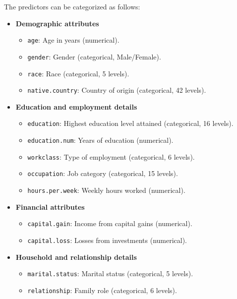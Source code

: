 \documentclass[
  11pt,
]{book}
\providecommand{\tightlist}{%
  \setlength{\itemsep}{0pt}\setlength{\parskip}{0pt}}
\theoremstyle{definition}
\theoremstyle{definition}
\theoremstyle{definition}
\theoremstyle{definition}
\theoremstyle{remark}
\begin{document}
The predictors can be categorized as follows:

\begin{itemize}
\tightlist
\item
  \textbf{Demographic attributes}

  \begin{itemize}
  \tightlist
  \item
    \texttt{age}: Age in years (numerical).\\
  \item
    \texttt{gender}: Gender (categorical, Male/Female).\\
  \item
    \texttt{race}: Race (categorical, 5 levels).\\
  \item
    \texttt{native.country}: Country of origin (categorical, 42 levels).
  \end{itemize}
\item
  \textbf{Education and employment details}

  \begin{itemize}
  \tightlist
  \item
    \texttt{education}: Highest education level attained (categorical, 16 levels).\\
  \item
    \texttt{education.num}: Years of education (numerical).\\
  \item
    \texttt{workclass}: Type of employment (categorical, 6 levels).\\
  \item
    \texttt{occupation}: Job category (categorical, 15 levels).\\
  \item
    \texttt{hours.per.week}: Weekly hours worked (numerical).
  \end{itemize}
\item
  \textbf{Financial attributes}

  \begin{itemize}
  \tightlist
  \item
    \texttt{capital.gain}: Income from capital gains (numerical).\\
  \item
    \texttt{capital.loss}: Losses from investments (numerical).
  \end{itemize}
\item
  \textbf{Household and relationship details}

  \begin{itemize}
  \tightlist
  \item
    \texttt{marital.status}: Marital status (categorical, 5 levels).\\
  \item
    \texttt{relationship}: Family role (categorical, 6 levels).
  \end{itemize}
\end{itemize}
\end{document}
